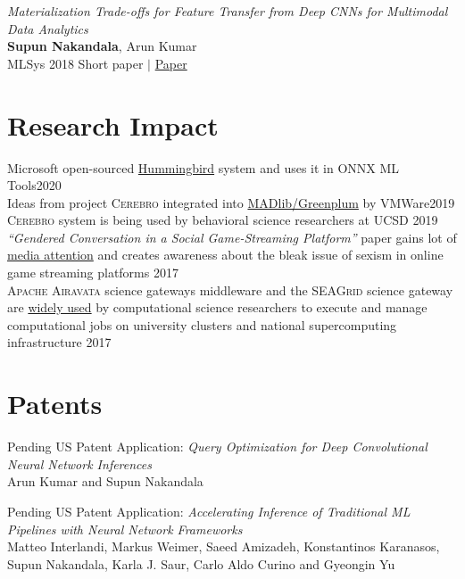 \documentclass[margin]{res}
\begin{document}
\begin{resume}
\par
\textit{Materialization Trade-offs for Feature Transfer from Deep CNNs for Multimodal Data Analytics} \\
\textbf{Supun Nakandala}, Arun Kumar\\
MLSys 2018 Short paper $|$ \href{https://adalabucsd.github.io/papers/2018_Vista_SysML.pdf}{Paper}



\section{Research Impact}
Microsoft open-sourced \href{https://github.com/microsoft/hummingbird}{Hummingbird} system and uses it in ONNX ML Tools\hfill 2020\\
Ideas from project \textsc{Cerebro} integrated into \href{https://tanzu.vmware.com/content/blog/model-selection-for-deep-neural-networks-on-greenplum-database}{MADlib/Greenplum} by VMWare\hfill 2019\\
\textsc{Cerebro} system is being used by behavioral science researchers at UCSD \hfill 2019\\
\textit{``Gendered Conversation in a Social Game-Streaming Platform''} paper gains lot of \href{https://docs.google.com/document/d/12zybT3kJb1JaW3c8oSx3hdH4g21MlkHA56C5_mkY_6I/edit?usp=sharing}{media attention} and creates awareness about the bleak issue of sexism in online game streaming platforms \hfill 2017\\
\textsc{Apache Airavata} science gateways middleware and the \textsc{SEAGrid} science gateway are \href{https://seagrid.org/publications/}{widely used} by computational science researchers to execute and manage computational jobs on university clusters and national supercomputing infrastructure \hfill 2017


\section{Patents}
\par
Pending US Patent Application: \textit{Query Optimization for Deep Convolutional Neural Network Inferences}\\
Arun Kumar and Supun Nakandala

\par
Pending US Patent Application: \textit{Accelerating Inference of Traditional ML Pipelines with Neural Network Frameworks}\\
Matteo Interlandi, Markus Weimer, Saeed Amizadeh, Konstantinos Karanasos,
Supun Nakandala, Karla J. Saur, Carlo Aldo Curino and Gyeongin Yu



\end{resume}
\end{document}
